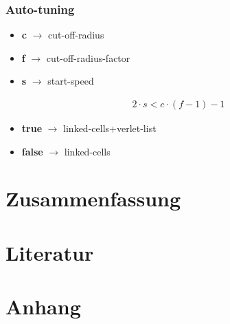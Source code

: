 \documentclass[
	12pt,
	a4paper,
	BCOR10mm,
	DIV14,
	headsepline,
]{scrreprt}
\begin{document}
\subsection{Auto-tuning}
\begin{itemize}
	\item \textbf{c} $\rightarrow$ cut-off-radius
	\item \textbf{f} $\rightarrow$ cut-off-radius-factor
	\item \textbf{s} $\rightarrow$ start-speed
\end{itemize}

\begin{align*}
2\cdot s < c \cdot (f - 1) - 1
\end{align*}

\begin{itemize}
	\item \textbf{true} $\rightarrow$ linked-cells+verlet-list
	\item \textbf{false} $\rightarrow$ linked-cells
\end{itemize}
\chapter{Zusammenfassung}
\label{Zusammenfassung}


\chapter{Literatur}
\label{Literatur}


\chapter{Anhang}
\label{Anhang}
\end{document}
